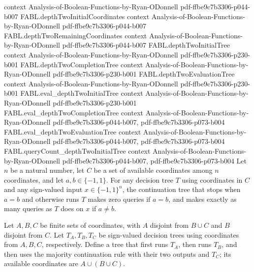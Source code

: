 \begin{theorem}
  {context}
  {Analysis-of-Boolean-Functions-by-Ryan-ODonnell}
  {pdf-ffbe9c7b3306-p044-b007}
\proofstep
  {FABL.depthTwoInitialCoordinates}
  {context}
  {Analysis-of-Boolean-Functions-by-Ryan-ODonnell}
  {pdf-ffbe9c7b3306-p044-b007}
\proofstep
  {FABL.depthTwoRemainingCoordinates}
  {context}
  {Analysis-of-Boolean-Functions-by-Ryan-ODonnell}
  {pdf-ffbe9c7b3306-p044-b007}
\proofstep
  {FABL.depthTwoInitialTree}
  {context}
  {Analysis-of-Boolean-Functions-by-Ryan-ODonnell}
  {pdf-ffbe9c7b3306-p230-b001}
\proofstep
  {FABL.depthTwoCompletionTree}
  {context}
  {Analysis-of-Boolean-Functions-by-Ryan-ODonnell}
  {pdf-ffbe9c7b3306-p230-b001}
\proofstep
  {FABL.depthTwoEvaluationTree}
  {context}
  {Analysis-of-Boolean-Functions-by-Ryan-ODonnell}
  {pdf-ffbe9c7b3306-p230-b001}
\proofstep
  {FABL.eval_depthTwoInitialTree}
  {context}
  {Analysis-of-Boolean-Functions-by-Ryan-ODonnell}
  {pdf-ffbe9c7b3306-p230-b001}
\proofstep
  {FABL.eval_depthTwoCompletionTree}
  {context}
  {Analysis-of-Boolean-Functions-by-Ryan-ODonnell}
  {pdf-ffbe9c7b3306-p044-b007,
    pdf-ffbe9c7b3306-p073-b004}
\proofstep
  {FABL.eval_depthTwoEvaluationTree}
  {context}
  {Analysis-of-Boolean-Functions-by-Ryan-ODonnell}
  {pdf-ffbe9c7b3306-p044-b007,
    pdf-ffbe9c7b3306-p073-b004}
\proofstep
  {FABL.queryCount_depthTwoInitialTree}
  {context}
  {Analysis-of-Boolean-Functions-by-Ryan-ODonnell}
  {pdf-ffbe9c7b3306-p044-b007,
    pdf-ffbe9c7b3306-p073-b004}
Let $n$ be a natural number, let $C$ be a set of available coordinates among $n$
coordinates, and let $a,b\in\{−1,1\}$. For any decision tree $T$ using coordinates in
$C$ and any sign-valued input $x\in\{−1,1\}^{n}$, the continuation tree that stops when
$a=b$ and otherwise runs $T$ makes zero queries if $a=b$, and makes exactly as many
queries as $T$ does on $x$ if $a\ne b$.
\end{theorem}

\begin{definition}
\label{FABL.orderedMajorityThreeTree}
\leanok
{}
Let $A,B,C$ be finite sets of coordinates, with $A$ disjoint from $B\cup C$ and $B$
disjoint from $C$. Let $T_A,T_B,T_C$ be sign-valued decision trees using coordinates
from $A,B,C$, respectively. Define a tree that first runs $T_A$, then runs $T_B$, and
then uses the majority continuation rule with their two outputs and $T_C$; its available
coordinates are $A\cup(B\cup C)$.
\end{definition}

